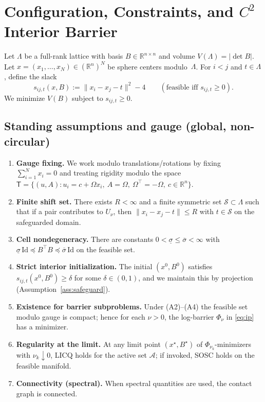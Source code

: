 \documentclass[11pt]{article}
\theoremstyle{remark}
\theoremstyle{definition}
\newcommand{\R}{\mathbb{R}}
\newcommand{\Id}{\mathrm{Id}}
\newcommand{\Triv}{\mathsf{T}}                 %
\newcommand{\ShiftSet}{\mathcal{S}}            %
\begin{document}
\section{Configuration, Constraints, and \texorpdfstring{$C^2$}{C2} Interior Barrier}\label{sec:barrier-setup}
Let $\Lambda$ be a full-rank lattice with basis $B\in\R^{n\times n}$ and volume $V(\Lambda)=|\det B|$. Let $x=(x_1,\dots,x_N)\in(\R^n)^N$ be sphere centers modulo~$\Lambda$.
For $i<j$ and $t\in\Lambda$, define the slack
\begin{equation}\label{eq:slack}
s_{ij,t}(x,B) := \|x_i-x_j-t\|^2 - 4 \qquad (\text{feasible iff } s_{ij,t}\ge 0).
\end{equation}
We minimize $V(B)$ subject to $s_{ij,t}\ge 0$.

\subsection*{Standing assumptions and gauge (global, non-circular)}
\begin{enumerate}[label=(A\arabic*),itemsep=2pt,topsep=2pt]
\item \textbf{Gauge fixing.} We work modulo translations/rotations by fixing $\sum_{i=1}^N x_i=0$ and treating rigidity modulo the space $\Triv=\{(u,A):u_i=c+\Omega x_i,\ A=\Omega,\ \Omega^\top=-\Omega,\ c\in\R^n\}$.
\item \textbf{Finite shift set.} There exists $R<\infty$ and a finite symmetric set $\ShiftSet\subset\Lambda$ such that if a pair contributes to $U_\nu$, then $\|x_i-x_j-t\|\le R$ with $t\in\ShiftSet$ on the safeguarded domain.
\item \textbf{Cell nondegeneracy.} There are constants $0<\underline{\sigma}\le \overline{\sigma}<\infty$ with
$\underline{\sigma}\,\Id \preceq B^\top B \preceq \overline{\sigma}\,\Id$ on the feasible set.
\item \textbf{Strict interior initialization.} The initial $(x^0,B^0)$ satisfies $s_{ij,t}(x^0,B^0)\ge\delta$ for some $\delta\in(0,1)$, and we maintain this by projection (Assumption~\ref{ass:safeguard}).
\item \textbf{Existence for barrier subproblems.} Under (A2)--(A4) the feasible set modulo gauge is compact; hence for each $\nu>0$, the log-barrier $\Phi_\nu$ in \eqref{eq:ip} has a minimizer.
\item \textbf{Regularity at the limit.} At any limit point $(x^\star,B^\star)$ of $\Phi_{\nu_k}$-minimizers with $\nu_k\downarrow 0$, LICQ holds for the active set $\mathcal{A}$; if invoked, SOSC holds on the feasible manifold.
\item \textbf{Connectivity (spectral).} When spectral quantities are used, the contact graph is connected.
\end{enumerate}
\end{document}
